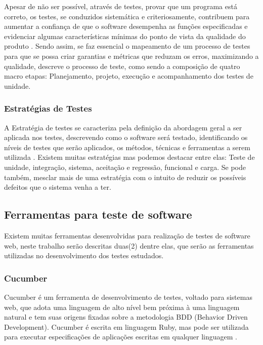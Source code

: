\documentclass[12pt]{article}
\begin{document}
	Apesar de não ser possível, através de testes, provar que um programa está correto, os testes, se conduzidos sistemática e criteriosamente, contribuem para aumentar a confiança de que o software desempenha as funções especificadas e evidenciar algumas características mínimas do ponto de vista da qualidade do produto \cite{maldonado2004introduccao}. Sendo assim, se faz essencial o mapeamento de um processo de testes para que se possa criar garantias e métricas que reduzam os erros, maximizando a qualidade, \citeauthor{crespo2004metodologia} \cite{crespo2004metodologia} descreve o processo de teste, como sendo a composição de quatro macro etapas: Planejamento, projeto, execução e acompanhamento dos testes de unidade.

	\subsubsection{Estratégias de Testes}
	A Estratégia de testes se caracteriza pela definição da abordagem geral a ser aplicada nos testes, descrevendo como o software será testado, identificando os níveis de testes que serão aplicados, os métodos, técnicas e ferramentas a serem utilizada \cite{rios2006teste}. Existem muitas estratégias mas podemos destacar entre elas: Teste de unidade, integração, sistema, aceitação e regressão, funcional e carga. Se pode também, mesclar mais de uma estratégia com o intuito de reduzir os possíveis defeitos que o sistema venha a ter.	

	\subsection{Ferramentas para teste de software}
	Existem muitas ferramentas desenvolvidas para realização de testes de software web, neste trabalho serão descritas duas(2) dentre elas, que serão as ferramentas utilizadas no desenvolvimento dos testes estudados.

	\subsubsection{Cucumber}
	Cucumber é um ferramenta de desenvolvimento de testes, voltado para sistemas web, que adota uma linguagem de alto nível bem próxima à uma linguagem natural e tem suas origens fixadas sobre a metodologia BDD (Behavior Driven Development). Cucumber é escrita em linguagem Ruby, mas pode ser utilizada para executar especificações de aplicações escritas em qualquer linguagem \cite{nunescucumber}. 
\end{document}
